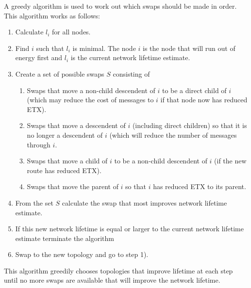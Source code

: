 A greedy algorithm is used to work out which swaps should be made in order.  This algorithm works as follows:
\begin{enumerate}
\item Calculate $l_i$ for all nodes.
\item Find $i$ such that $l_i$ is minimal.  The node $i$ is the node that will run out of energy first and $l_i$ is the current network lifetime estimate.
\item Create a set of possible swaps $S$ consisting of 
\begin{enumerate}
\item Swaps that move a non-child descendent of $i$ to be a direct child of $i$ (which may reduce the cost of messages to $i$ if that node now has reduced ETX).
\item Swaps that move a descendent of $i$ (including direct children) so that it is no longer a descendent of $i$ (which will reduce the number of messages through $i$.
\item Swaps that move a child of $i$ to be a non-child descendent of $i$ (if the new route has reduced ETX).
\item Swaps that move the parent of $i$ so that $i$ has reduced ETX to its parent.
\end{enumerate}
\item From the set $S$ calculate the swap that most improves network lifetime estimate.
\item If this new network lifetime is equal or larger to the current network lifetime estimate terminate the algorithm
\item Swap to the new topology and go to step 1).
\end{enumerate}

This algorithm greedily chooses topologies that improve lifetime at each step until no more swaps are available that will improve the network lifetime.

